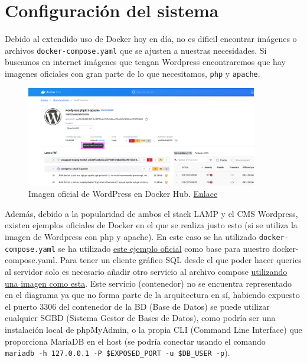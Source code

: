 \documentclass[a4paper]{article}
\begin{document}
\section{Configuración del sistema}

Debido al extendido uso de Docker hoy en día, no es dificil encontrar imágenes o archivos \texttt{docker-compose.yaml} que se ajusten a nuestras necesidades. Si buscamos en internet imágenes que tengan Wordpress encontraremos que hay imagenes oficiales con gran parte de lo que necesitamos, \texttt{php} y \texttt{apache}.

\begin{figure}[!h]
    \centering
    \includegraphics[width=0.9\textwidth]{images/docker_hub_wordpress.png}
    \caption{Imagen oficial de WordPress en Docker Hub. \href{https://hub.docker.com/layers/library/wordpress/php8.3-fpm/images/sha256-1841db5f891825b1c279bf170338cb17f868f1ef257fa2cd73ad2c2ed2cb9b0e}{Enlace}}
    \label{fig:docker_wordpress}
\end{figure}

\vspace{1em}

Además, debido a la popularidad de ambos el stack LAMP y el CMS Wordpress, existen ejemplos oficiales de Docker en el que se realiza justo esto (si se utiliza la imagen de Wordpress con php y apache). En este caso se ha utilizado \texttt{docker-compose.yaml} se ha utilizado \href{https://github.com/docker/awesome-compose/blob/master/official-documentation-samples/wordpress/README.md}{este ejemplo oficial} como base para nuestro docker-compose.yaml. Para tener un cliente gráfico SQL desde el que poder hacer queries al servidor solo es necesario añadir otro servicio al archivo compose \href{https://hub.docker.com/_/phpmyadmin}{utilizando una imagen como esta}. Este servicio (contenedor) no se encuentra representado en el diagrama ya que no forma parte de la arquitectura en sí, habiendo expuesto el puerto 3306 del contenedor de la BD (Base de Datos) se puede utilizar cualquier SGBD (Sistema Gestor de Bases de Datos), como podría ser una instalación local de phpMyAdmin, o la propia CLI (Command Line Interface) que proporciona MariaDB en el host (se podría conectar usando el comando \\ \texttt{mariadb -h 127.0.0.1 -P \$EXPOSED\_PORT -u \$DB\_USER -p}).
\end{document}
